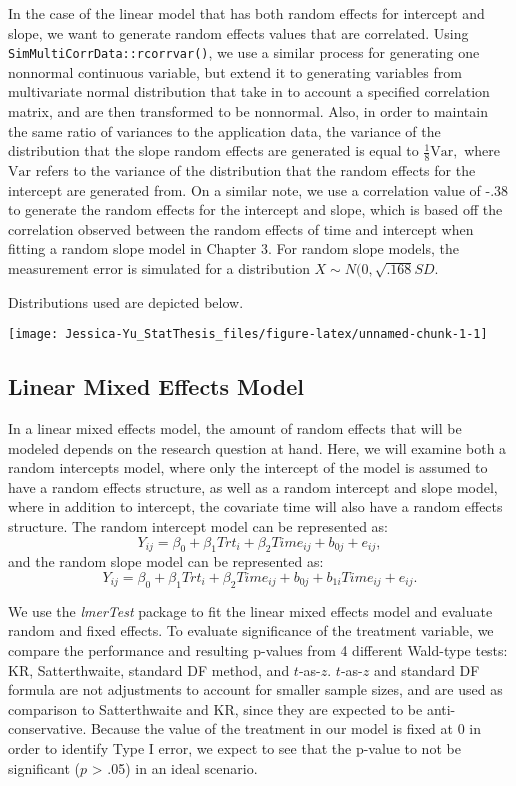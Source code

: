 \documentclass[12pt, twoside]{amherstthesis}
\begin{document}
In the case of the linear model that has both random effects for intercept and slope, we want to generate random effects values that are correlated. Using \texttt{SimMultiCorrData::rcorrvar()}, we use a similar process for generating one nonnormal continuous variable, but extend it to generating variables from multivariate normal distribution that take in to account a specified correlation matrix, and are then transformed to be nonnormal. Also, in order to maintain the same ratio of variances to the application data, the variance of the distribution that the slope random effects are generated is equal to \(\frac{1}{8}\text{Var},\) where \(\text{Var}\) refers to the variance of the distribution that the random effects for the intercept are generated from. On a similar note, we use a correlation value of -.38 to generate the random effects for the intercept and slope, which is based off the correlation observed between the random effects of time and intercept when fitting a random slope model in Chapter 3. For random slope models, the measurement error is simulated for a distribution \(X\sim\mathit{N}(0,\sqrt{.168}SD.\)

Distributions used are depicted below.
\begin{center}\texttt{[image: Jessica-Yu\_StatThesis\_files/figure-latex/unnamed-chunk-1-1]} \end{center}

\hypertarget{linear-mixed-effects-model}{%
\subsection{Linear Mixed Effects Model}\label{linear-mixed-effects-model}}

In a linear mixed effects model, the amount of random effects that will be modeled depends on the research question at hand. Here, we will examine both a random intercepts model, where only the intercept of the model is assumed to have a random effects structure, as well as a random intercept and slope model, where in addition to intercept, the covariate time will also have a random effects structure. The random intercept model can be represented as: \[Y_{ij} = \beta_0 + \beta_1Trt_i + \beta_2Time_{ij} + b_{0j} + e_{ij},\] and the random slope model can be represented as: \[Y_{ij} = \beta_0 + \beta_1Trt_i + \beta_2Time_{ij} + b_{0j} + b_{1i}Time_{ij} + e_{ij}.\]

We use the \emph{lmerTest} package to fit the linear mixed effects model and evaluate random and fixed effects. To evaluate significance of the treatment variable, we compare the performance and resulting p-values from 4 different Wald-type tests: KR, Satterthwaite, standard DF method, and \(t\)-as-\(z\). \(t\)-as-\(z\) and standard DF formula are not adjustments to account for smaller sample sizes, and are used as comparison to Satterthwaite and KR, since they are expected to be anti-conservative. Because the value of the treatment in our model is fixed at 0 in order to identify Type I error, we expect to see that the p-value to not be significant (\(p\) \textgreater{} .05) in an ideal scenario.
\end{document}
